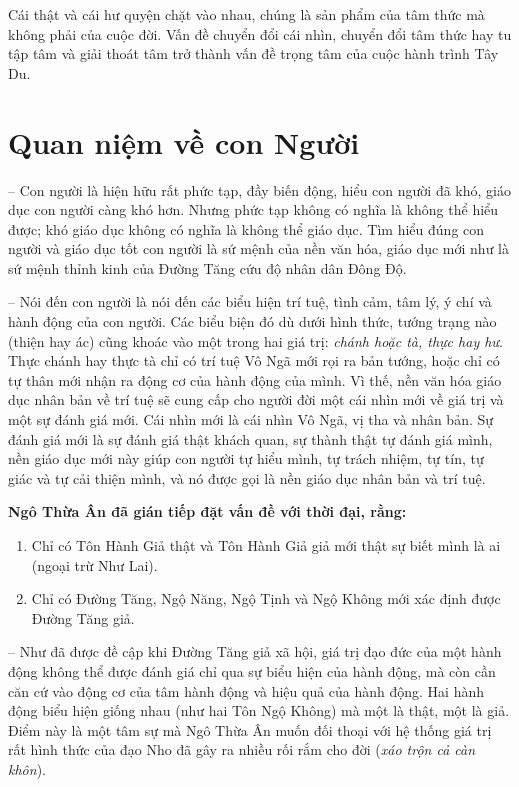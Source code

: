 Cái thật và cái hư quyện chặt vào nhau, chúng là sản phẩm của tâm thức mà không phải của cuộc đời. Vấn đề chuyển đổi cái nhìn, chuyển đổi tâm thức hay tu tập tâm và giải thoát tâm trở thành vấn đề trọng tâm của cuộc hành trình Tây Du.

\section{Quan niệm về con Người} %
\label{sec:56_57_con_nguoi}

-- Con người là hiện hữu rất phức tạp, đầy biến động, hiểu con người đã khó, giáo dục con người càng khó hơn. Nhưng phức tạp không có nghĩa là không thể hiểu được; khó giáo dục không có nghĩa là không thể giáo dục. Tìm hiểu đúng con người và giáo dục tốt con người là sứ mệnh của nền văn hóa, giáo dục mới như là sứ mệnh thỉnh kinh của Đường Tăng cứu độ nhân dân Đông Độ.

-- Nói đến con người là nói đến các biểu hiện trí tuệ, tình cảm, tâm lý, ý chí và hành động của con người. Các biểu biện đó dù dưới hình thức, tướng trạng nào (thiện hay ác) cũng khoác vào một trong hai giá trị: \emph{chánh hoặc tà, thực hay hư}. Thực chánh hay thực tà chỉ có trí tuệ Vô Ngã mới rọi ra bản tướng, hoặc chỉ có tự thân mới nhận ra động cơ của hành động của mình. Vì thế, nền văn hóa giáo dục nhân bản về trí tuệ sẽ cung cấp cho người đời một cái nhìn mới về giá trị và một sự đánh giá mới. Cái nhìn mới là cái nhìn Vô Ngã, vị tha và nhân bản. Sự đánh giá mới là sự đánh giá thật khách quan, sự thành thật tự đánh giá mình, nền giáo dục mới này giúp con người tự hiểu mình, tự trách nhiệm, tự tín, tự giác và tự cải thiện mình, và nó được gọi là nền giáo dục nhân bản và trí tuệ.

{\bf Ngô Thừa Ân đã gián tiếp đặt vấn đề với thời đại, rằng:}

\begin{enumerate}[label=\itshape\alph*\upshape/]
    \item Chỉ có Tôn Hành Giả thật và Tôn Hành Giả giả mới thật sự biết mình là ai (ngoại trừ Như Lai).

    \item Chỉ có Đường Tăng, Ngộ Năng, Ngộ Tịnh và Ngộ Không mới xác định được Đường Tăng giả.
\end{enumerate}

-- Như đã được đề cập khi Đường Tăng giả xã hội, giá trị đạo đức của một hành động không thể được đánh giá chỉ qua sự biểu hiện của hành động, mà còn cần căn cứ vào động cơ của tâm hành động và hiệu quả của hành động. Hai hành động biểu hiện giống nhau (như hai Tôn Ngộ Không) mà một là thật, một là giả. Điểm này là một tâm sự mà Ngô Thừa Ân muốn đối thoại với hệ thống giá trị rất hình thức của đạo Nho đã gây ra nhiều rối rắm cho đời (\emph{xáo trộn cả càn khôn}).

